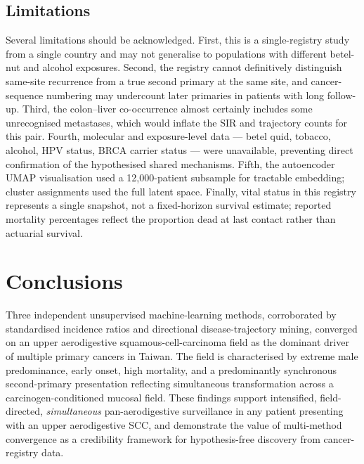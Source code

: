 \documentclass[review,12pt]{elsarticle}
\begin{document}
\subsection{Limitations}
Several limitations should be acknowledged. First, this is a single-registry
study from a single country and may not generalise to populations with different
betel-nut and alcohol exposures. Second, the registry cannot definitively
distinguish same-site recurrence from a true second primary at the same site, and
cancer-sequence numbering may undercount later primaries in patients with long
follow-up. Third, the colon--liver co-occurrence almost certainly includes some
unrecognised metastases, which would inflate the SIR and trajectory counts for
this pair. Fourth, molecular and exposure-level data --- betel quid, tobacco,
alcohol, HPV status, BRCA carrier status --- were unavailable, preventing direct
confirmation of the hypothesised shared mechanisms. Fifth, the autoencoder UMAP
visualisation used a 12,000-patient subsample for tractable embedding; cluster
assignments used the full latent space. Finally, vital status in this registry
represents a single snapshot, not a fixed-horizon survival estimate; reported
mortality percentages reflect the proportion dead at last contact rather than
actuarial survival.

\section{Conclusions}

Three independent unsupervised machine-learning methods, corroborated by
standardised incidence ratios and directional disease-trajectory mining,
converged on an upper aerodigestive squamous-cell-carcinoma field as the dominant
driver of multiple primary cancers in Taiwan. The field is characterised by
extreme male predominance, early onset, high mortality, and a predominantly
synchronous second-primary presentation reflecting simultaneous transformation
across a carcinogen-conditioned mucosal field. These findings support
intensified, field-directed, \textit{simultaneous} pan-aerodigestive surveillance
in any patient presenting with an upper aerodigestive SCC, and demonstrate the value
of multi-method convergence as a credibility framework for hypothesis-free
discovery from cancer-registry data.

\end{document}
